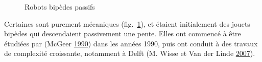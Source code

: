 \documentclass[french,A4paper,]{book}
\begin{document}
\begin{figure}
\centering

\hspace*{\fill}
\hfill%
\hspace*{\fill}

\caption{Robots bipèdes passifs}

\label{fig:bipedesactifs}

\end{figure}

Certaines sont purement mécaniques (fig.~\ref{fig:bipedesactifs}), et
étaient initialement des jouets bipèdes qui descendaient passivement une
pente. Elles ont commencé à être étudiées par (McGeer
\protect\hyperlink{ref-mcgeer90}{1990}) dans les années 1990, puis ont
conduit à des travaux de complexité croissante, notamment à Delft (M.
Wisse et Van der Linde \protect\hyperlink{ref-wisse07}{2007}).
\end{document}
